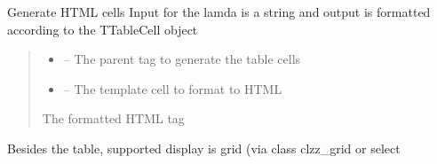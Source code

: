 \documentclass[letterpaper,10pt,english]{sphinxmanual}
\begin{document}
\begin{savenotes}
\begin{fulllineitems}
\begin{savenotes}\begin{fulllineitems}
\label{\detokenize{eezz:eezz.http_agent.THttpAgent.generate_html_cells}}
\pysigstartsignatures
{}
\pysigstopsignatures
\sphinxAtStartPar
Generate HTML cells
Input for the lamda is a string and output is formatted according to the TTableCell object
\begin{quote}\begin{description}
\begin{itemize}
\item {} 
\sphinxAtStartPar
{} – The parent tag to generate the table cells

\item {} 
\sphinxAtStartPar
{} – The template cell to format to HTML

\end{itemize}

\sphinxAtStartPar
The formatted HTML tag

\end{description}\end{quote}

\end{fulllineitems}\end{savenotes}


\begin{savenotes}\begin{fulllineitems}
\label{\detokenize{eezz:eezz.http_agent.THttpAgent.generate_html_grid}}
\pysigstartsignatures
{}
\pysigstopsignatures
\sphinxAtStartPar
Besides the table, supported display is grid (via class clzz\_grid or select

\end{fulllineitems}\end{savenotes}


\end{fulllineitems}
\end{savenotes}
\end{document}
